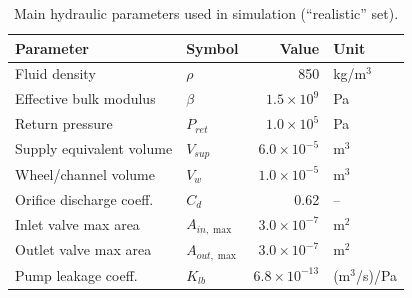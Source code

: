 \documentclass[a4paper]{ifacconf}
\begin{document}
\begin{table}[tb]
    \caption{Main hydraulic parameters used in simulation (``realistic'' set).}\label{tab:params}
    \centering
    \begin{tabular}{l l r l}
        \toprule
        Parameter                & Symbol         & Value                & Unit         \\
        \midrule
        Fluid density            & $\rho$         & 850                  & kg/m$^3$     \\
        Effective bulk modulus   & $\beta$        & $1.5\times 10^9$     & Pa           \\
        Return pressure          & $P_{ret}$      & $1.0\times 10^5$     & Pa           \\
        Supply equivalent volume & $V_{sup}$      & $6.0\times 10^{-5}$  & m$^3$        \\
        Wheel/channel volume     & $V_w$          & $1.0\times 10^{-5}$  & m$^3$        \\
        Orifice discharge coeff. & $C_d$          & 0.62                 & --           \\
        Inlet valve max area     & $A_{in,\max}$  & $3.0\times 10^{-7}$  & m$^2$        \\
        Outlet valve max area    & $A_{out,\max}$ & $3.0\times 10^{-7}$  & m$^2$        \\
        Pump leakage coeff.      & $K_{lb}$       & $6.8\times 10^{-13}$ & (m$^3$/s)/Pa \\
        \bottomrule
    \end{tabular}
\end{table}
\end{document}
